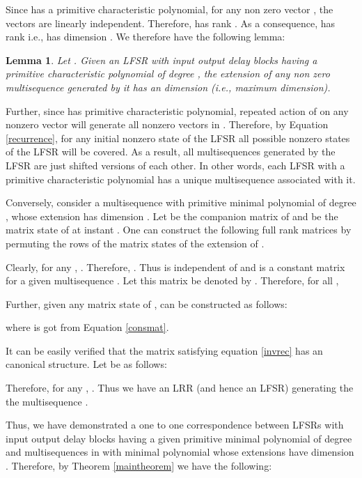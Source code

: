 \documentclass[letterpaper, 12 pt]{article}  \usepackage{amssymb}
\newtheorem{lemma}[theorem]{Lemma}
\begin{document}
Since  has a primitive characteristic polynomial, for any non zero
vector , the vectors  are
linearly independent. Therefore,  has rank . As a consequence,
 has rank  i.e.,  has dimension . We therefore have the
following lemma:

\begin{lemma}
Let . Given an LFSR with
input output delay blocks having a primitive characteristic polynomial
 of degree , the extension of any non zero multisequence generated
by it has an dimension  (i.e., maximum dimension).
\end{lemma}

Further, since  has primitive characteristic polynomial, repeated
action of  on any nonzero vector  will generate all
nonzero vectors in . Therefore, by Equation \eqref{recurrence}, for any
initial nonzero state of the LFSR all possible nonzero states of the LFSR will
be covered. As a result, all multisequences generated by the LFSR are just
shifted versions of each other. In other words, each LFSR with a primitive
characteristic polynomial has a unique multisequence associated with it.

Conversely, consider a multisequence  with
primitive minimal polynomial  of degree , whose extension has
dimension . Let  be the companion matrix of  and  be the 
matrix state of  at instant . One can construct the following full rank
matrices  by permuting the rows of the matrix states of the
extension of .

{\small
 }

Clearly, for any  , . Therefore,
. Thus
  is independent of  and is a constant matrix for a given
multisequence . Let this matrix be denoted by . Therefore, for
all , 

Further, given any matrix state  of ,  can be
constructed as follows: 

where  is got from Equation \eqref{consmat}.

It can be easily verified that the matrix  satisfying equation
\eqref{invrec} has an canonical structure. Let  be as follows: 

Therefore, for any , . Thus we have an LRR (and hence an LFSR) generating the  
the multisequence .

Thus, we have demonstrated a one to one correspondence between LFSRs with
input output delay blocks having a given primitive minimal polynomial
 of degree  and multisequences in  with minimal polynomial
 whose extensions have dimension . Therefore, by Theorem
\ref{maintheorem} we have the following:
\end{document}

